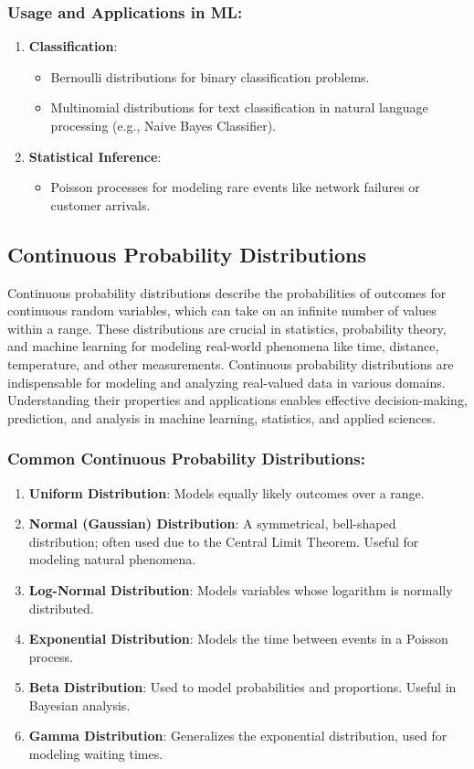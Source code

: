 \subsubsection*{Usage and Applications in ML:}
\begin{enumerate}
    \item \textbf{Classification}:
    \begin{itemize}
        \item Bernoulli distributions for binary classification problems.
        \item Multinomial distributions for text classification in natural language processing (e.g., Naive Bayes Classifier).
    \end{itemize}
    \item \textbf{Statistical Inference}:
    \begin{itemize}
        \item Poisson processes for modeling rare events like network failures or customer arrivals.
    \end{itemize}
\end{enumerate}

\subsection*{Continuous Probability Distributions}
Continuous probability distributions describe the probabilities of outcomes for continuous random variables, which can take on an infinite number of values within a range. These distributions are crucial in statistics, probability theory, and machine learning for modeling real-world phenomena like time, distance, temperature, and other measurements. Continuous probability distributions are indispensable for modeling and analyzing real-valued data in various domains. Understanding their properties and applications enables effective decision-making, prediction, and analysis in machine learning, statistics, and applied sciences.

\subsubsection*{Common Continuous Probability Distributions:}
\begin{enumerate}
    \item \textbf{Uniform Distribution}: Models equally likely outcomes over a range.
    \item \textbf{Normal (Gaussian) Distribution}: A symmetrical, bell-shaped distribution; often used due to the Central Limit Theorem. Useful for modeling natural phenomena.
    \item \textbf{Log-Normal Distribution}: Models variables whose logarithm is normally distributed.
    \item \textbf{Exponential Distribution}: Models the time between events in a Poisson process.
    \item \textbf{Beta Distribution}: Used to model probabilities and proportions. Useful in Bayesian analysis.
    \item \textbf{Gamma Distribution}: Generalizes the exponential distribution, used for modeling waiting times.
\end{enumerate}

